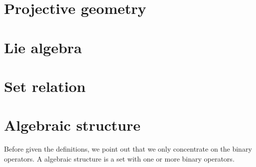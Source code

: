 \documentclass{amsbook}
\theoremstyle{definition}
\theoremstyle{remark}
\numberwithin{section}{chapter}
\numberwithin{equation}{chapter}
\begin{document}
\chapter{Projective geometry}

\chapter{Lie algebra}


\appendix
\chapter{Set relation}
\chapter{Algebraic structure}
Before given the definitions, we point out that we only concentrate on the binary operators. 
A algebraic structure is a set with one or more binary operators.




\backmatter


\printindex
\end{document}
